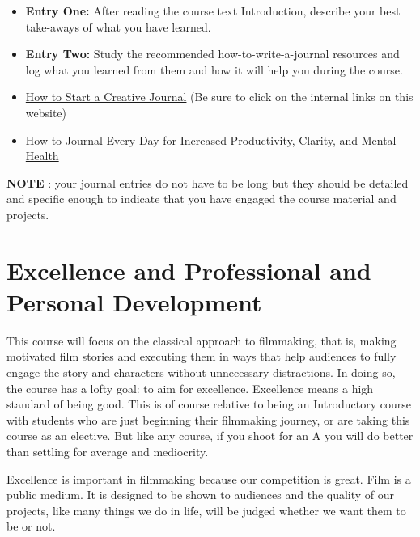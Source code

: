 \documentclass[
]{book}
\providecommand{\tightlist}{%
  \setlength{\itemsep}{0pt}\setlength{\parskip}{0pt}}
\begin{document}
\begin{reflect}
\begin{itemize}
\tightlist
\item
  \textbf{Entry One:} After reading the course text Introduction, describe your best take-aways of what you have learned.
\item
  \textbf{Entry Two:} Study the recommended how-to-write-a-journal resources and log what you learned from them and how it will help you during the course.
\item
  \href{https://karenbanes.com/how-to-start-a-creative-journal}{How to Start a Creative Journal} (Be sure to click on the internal links on this website)\\
\item
  \href{https://www.youtube.com/watch?v=hUTWo7_W0lc}{How to Journal Every Day for Increased Productivity, Clarity, and Mental Health}
\end{itemize}
\end{reflect}

\begin{caution}
\textbf{NOTE} : your journal entries do not have to be long but they should be detailed and specific enough to indicate that you have engaged the course material and projects.
\end{caution}

\hypertarget{excellence-and-professional-and-personal-development}{%
\section{Excellence and Professional and Personal Development}\label{excellence-and-professional-and-personal-development}}

This course will focus on the classical approach to filmmaking, that is, making motivated film stories and executing them in ways that help audiences to fully engage the story and characters without unnecessary distractions. In doing so, the course has a lofty goal: to aim for excellence. Excellence means a high standard of being good. This is of course relative to being an Introductory course with students who are just beginning their filmmaking journey, or are taking this course as an elective. But like any course, if you shoot for an A you will do better than settling for average and mediocrity.

Excellence is important in filmmaking because our competition is great. Film is a public medium. It is designed to be shown to audiences and the quality of our projects, like many things we do in life, will be judged whether we want them to be or not.
\end{document}
